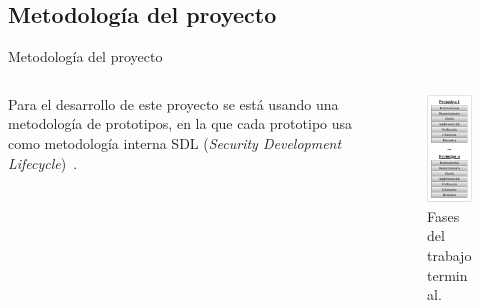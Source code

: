 \subsection{Metodología del proyecto} %
\begin{frame}{Metodología del proyecto}

  \begin{columns}

    \begin{column}{0.5\textwidth}
      Para el desarrollo de este proyecto se está usando una metodología de
      prototipos, en la que cada prototipo usa como metodología interna SDL
      (\textit{Security Development Lifecycle})~\cite{sdl}.
    \end{column}

    \begin{column}{0.5\textwidth}
      \begin{figure}[H]
        \begin{center}
          \includegraphics[width=0.5\linewidth]{diagramas/metodologia.png}
          \caption{Fases del trabajo terminal.}
        \end{center}
      \end{figure}
    \end{column}

  \end{columns}



\end{frame}

